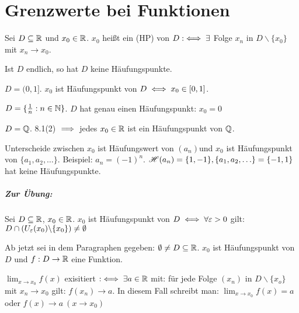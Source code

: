 \documentclass[a4paper,oneside,DIV15,BCOR12mm]{scrbook}
\begin{document}
\chapter{Grenzwerte bei Funktionen}

\begin{definition}[Häufungspunkt]
Sei $D\subseteq\mathbb{R}$ und $x_0 \in\mathbb{R}$. $x_0$ heißt ein  (HP) von $D :\iff \exists$ Folge $x_n$ in $D\backslash \{x_0\}$ mit $x_n \to x_0$.
\end{definition}

\begin{beispiele}
\item Ist $D$ endlich, so hat $D$ keine Häufungspunkte.
\item $D = (0,1]$. $x_0$ ist Häufungspunkt von $D \iff x_0 \in [0,1]$.
\item $D = \{\frac{1}{n}: n\in\mathbb{N}\}$. $D$ hat genau einen Häufungspunkt: $x_0 = 0$
\item $D = \mathbb{Q}$. 8.1(2) $\implies$ jedes $x_0 \in\mathbb{R}$ ist ein Häufungspunkt von $\mathbb{Q}$.
\end{beispiele}

\begin{bemerkung}
Unterscheide zwischen \glqq $x_0$ ist Häufungswert von $(a_n)$\grqq und \glqq $x_0$ ist Häufungspunkt von $\{a_1,a_2,\ldots\}$\grqq. Beispiel: $a_n=(-1)^n$. $\mathscr{H}(a_n) = \{1,-1\}, \{a_1,a_2,\ldots\} = \{-1,1\}$ hat keine Häufungspunkte.
\end{bemerkung}

\paragraph{Zur Übung:} Sei $D\subseteq\mathbb{R}$, $x_0 \in\mathbb{R}$. $x_0$ ist Häufungspunkt von $D \iff \forall\varepsilon>0$ gilt: $D\cap(U_\varepsilon(x_0) \backslash\{x_0\}) \ne \emptyset$

\begin{vereinbarung}
Ab jetzt sei in dem Paragraphen gegeben: $\emptyset \ne D \subseteq \mathbb{R}$. $x_0$ ist Häufungspunkt von $D$ und $f: D \to \mathbb{R}$ eine Funktion.
\end{vereinbarung}

\begin{definition}
$\displaystyle\lim_{x\to x_0}f(x)$ exisitiert $:\iff \exists a\in\mathbb{R}$ mit: für jede Folge $(x_n)$ in $D\backslash\{x_o\}$ mit $x_n \to x_0$ gilt: $f(x_n) \to a$. In diesem Fall schreibt man: $\displaystyle\lim_{x\to x_0}f(x) = a$ oder $f(x) \to a \ (x\to x_0)$
\end{definition}
\end{document}
